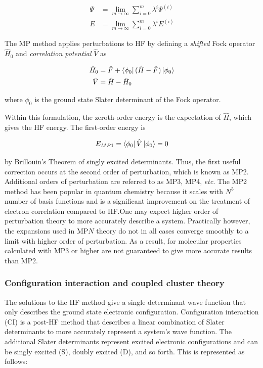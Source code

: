 \begin{align}
 \Psi &= \lim_{m\to\infty} \sum_{i=0}^{m} \lambda^i \Psi^{(i)} \\
  E &= \lim_{m\to\infty} \sum_{i=0}^{m} \lambda^i E^{(i)}
\end{align}

The MP method applies perturbations to HF by defining a \emph{shifted} Fock
operator $\hat{H}_0$ and \emph{correlation potential} $\hat{V}$ as

\begin{align}
  \hat{H}_0 &= \hat{F} + \bra{\phi_0}(\hat{H}-\hat{F})\ket{\phi_0} \\
  \hat{V}   &= \hat{H} - \hat{H}_0
\end{align}

\noindent where $\phi_0$ is the ground state Slater determinant of the Fock
operator.

Within this formulation, the zeroth-order energy is the expectation of
$\hat{H}$, which gives the HF energy. The first-order energy is

\begin{equation}
  E_{MP1} = \bra{\phi_0}\hat{V}\ket{\phi_0} = 0
\end{equation}

\noindent by Brillouin's Theorem of singly excited determinants. Thus, the first
useful correction occurs at the second order of perturbation, which is known as
MP2. Additional orders of perturbation are referred to as MP3, MP4, \emph{etc}.
The MP2 method has been popular in quantum chemistry because it scales with
$N^5$ number of basis functions and is a significant improvement on the
treatment of electron correlation compared to HF.\@ One may expect higher order
of perturbation theory to more accurately describe a system. Practically
however, the expansions used in MP$N$ theory do not in all cases converge
smoothly to a limit with higher order of perturbation.\cite{Leininger2000} As a
result, for molecular properties calculated with MP3 or higher are not
guaranteed to give more accurate results than MP2.

\subsubsection{Configuration interaction and coupled cluster theory}

The solutions to the HF method give a single determinant wave function that
only describes the ground state electronic configuration. Configuration
interaction (CI) is a post-HF method that describes a linear combination of
Slater determinants to more accurately represent a system's wave function. The
additional Slater determinants represent excited electronic configurations and
can be singly excited (S), doubly excited (D), and so forth. This is
represented as follows:

